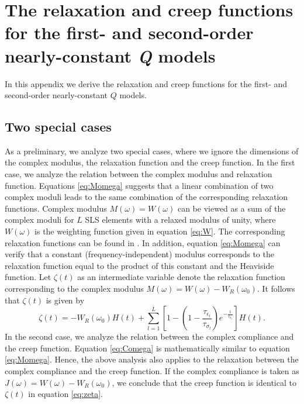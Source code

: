 \documentclass[article]{./macros/elsarticle_qh}
\begin{document}
\section{The relaxation and creep functions for the first- and second-order nearly-constant \textit{Q} models } 
In this appendix we derive the relaxation and creep functions for the first- and second-order nearly-constant $Q$ models. 

\subsection{Two special cases}
As a preliminary, we analyze two special cases, where we ignore the dimensions of the complex modulus, the relaxation function and the creep function. In the first case, we analyze the relation between the complex modulus and relaxation function. Equations \ref{eq:Momega} suggests that a linear combination of two complex moduli leads to the same combination of the corresponding relaxation functions. Complex modulus $M(\omega) = W(\omega)$ can be viewed as a sum of the complex moduli for $L$ SLS elements with a relaxed modulus of unity, where $W(\omega)$ is the weighting function given in equation \ref{eq:W}. The corresponding relaxation functions can be found in \cite{carcione:2014}. In addition, equation \ref{eq:Momega} can verify that a constant (frequency-independent) modulus corresponds to the relaxation function equal to the product of this constant and the Heaviside function. 
Let $\zeta(t)$ as an intermediate variable denote the relaxation function corresponding to the complex modulus $M(\omega) = W(\omega) - W_{R}(\omega_{0})$. It follows that $\zeta(t)$ is given by
\begin{equation} \label{eq:zeta}
\zeta(t) = - W_{R}(\omega_{0}) H(t) 
+ 
\sum_{l=1}^{L} 
\left[
1 - \left(1 - 
\frac{\tau_{\epsilon_l}}{\tau_{\sigma_l}} 
\right)
e^{-\frac{t}{\tau_{\sigma_l}}}
\right] H(t). 
\end{equation}
In the second case, we analyze the relation between the complex compliance and the creep function. Equation \ref{eq:Comega} is mathematically similar to equation \ref{eq:Momega}. Hence, the above analysis also applies to the relaxation between the complex compliance and the creep function. If the complex compliance is taken as $J(\omega) = W(\omega) - W_{R}(\omega_{0})$, we conclude that the creep function is identical to $\zeta(t)$ in equation \ref{eq:zeta}.
\end{document}
